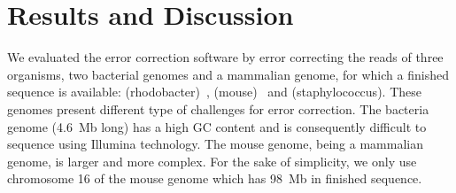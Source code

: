 \documentclass[10pt]{bmc_article}
\newenvironment{bmcformat}{\fussy\setboolean{publ}{true}}{\fussy}
\begin{document}
\begin{bmcformat}


 
\section*{Results and Discussion}

We evaluated the error correction software by error correcting the reads of three organisms, two bacterial genomes and a mammalian genome, for which a finished sequence is available:  (rhodobacter)~\cite{Mackenzie2001},  (mouse)~\cite{Waterston2002} and  (staphylococcus).
These genomes present different type of challenges for error correction.
The  bacteria genome (\SI{4.6}{Mb} long) has a high GC content and is consequently difficult to sequence using Illumina technology.
The mouse genome, being a mammalian genome, is larger and more complex.
For the sake of simplicity, we only use chromosome 16 of the mouse genome which has \SI{98}{Mb} in finished sequence.


\end{bmcformat}
\end{document}
